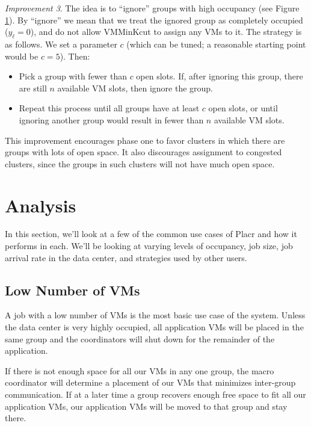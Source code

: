 \documentclass[11pt]{article}
\begin{document}
\begin{trivlist}
\begin{figure}
 \label{fig:improvements}

\end{figure}

\item \textit{Improvement 3}. The idea is to ``ignore'' groups with high occupancy (see Figure \ref{fig:improvements}).  By ``ignore'' we mean that we treat the ignored group as completely occupied ($y_\ell = 0$), and do not allow VMMinKcut to assign any VMs to it.  The strategy is as follows.  We set a parameter $c$ (which can be tuned; a reasonable starting point would be $c=5$).  Then:

\begin{itemize}
  \item Pick a group with fewer than $c$ open slots.  If, after ignoring this group, there are still $n$ available VM slots, then ignore the group.
  \item Repeat this process until all groups have at least $c$ open slots, or until ignoring another group would result in fewer than $n$ available VM slots.
\end{itemize}

This improvement encourages phase one to favor clusters in which there are groups with lots of open space.  It also discourages assignment to congested clusters, since the groups in such clusters will not have much open space.

\end{trivlist}

\FloatBarrier
\section{Analysis}

In this section, we'll look at a few of the common use cases of Placr and how it performs in each.  We'll be looking at varying levels of occupancy, job size, job arrival rate in the data center, and strategies used by other users.

\subsection{Low Number of VMs}

A job with a low number of VMs is the most basic use case of the system.  Unless the data center is very highly occupied, all application VMs will be placed in the same group and the coordinators will shut down for the remainder of the application.

If there is not enough space for all our VMs in any one group, the macro coordinator will determine a placement of our VMs that minimizes inter-group communication.  If at a later time a group recovers enough free space to fit all our application VMs, our application VMs will be moved to that group and stay there.
\end{document}
